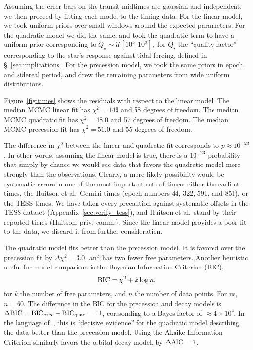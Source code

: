 \documentclass[12pt,twocolumn,tighten]{aastex62}
\begin{document}
Assuming the error bars on the transit midtimes are gaussian and
independent, we then proceed by fitting each model to the timing
data.
For the linear model, we took uniform priors over small windows around
the expected parameters.
For the quadratic model we did the same, and took the quadratic term
to have a uniform prior corresponding to
$
  Q_\star \sim \mathcal{U}[10^3, 10^9],
$
for $Q_\star$ the ``quality factor'' corresponding to the star's
response against tidal forcing, defined in
\S~\ref{sec:implications}.
For the precession model, we took the same priors in epoch and
sidereal period, and drew the remaining parameters from wide
uniform distributions.

Figure~\ref{fig:times} shows the residuals with respect to the linear
model.
The median MCMC linear fit has $\chi^2 = 149$ and 58 degrees of freedom.
The median MCMC quadratic fit has $\chi^2 = 48.0$ and 57 degrees of freedom.
The median MCMC precession fit has $\chi^2 = 51.0$ and 55 degrees of freedom.


The difference in $\chi^2$ between the linear and quadratic fit
corresponds to $p \approx 10^{-23}$. In other words, assuming the
linear model is true, there is a $10^{-23}$ probability that simply by
chance we would see data that favors the quadratic model more strongly
than the observations.  Clearly, a more likely possibility would be
systematic errors in one of the most important sets of times: either
the earliest times, the Huitson et al.\ Gemini times (epoch numbers
44, 322, 591, and 851), or the TESS times. 
We have taken every precaution against systematic offsets in the
TESS dataset (Appendix~\ref{sec:verify_tess}), and Huitson et al.\ 
stand by their reported times (Huitson, priv. comm.).
Since the linear model provides a poor fit to the data, we discard it
from further consideration.

The quadratic model fits better than the precession model.
It is favored over the precession fit by $\Delta \chi^2 = 3.0$,
and has two fewer free parameters.
Another heuristic useful for model comparison is the Bayesian
Information Criterion (BIC),
\begin{equation}
  {\rm BIC} = \chi^2 + k\log n,
\end{equation}
for $k$ the number of free parameters, and $n$ the number of data
points. For us, $n=60$.
The difference in the BIC for the precession and decay models is
$\Delta {\rm BIC} = {\rm BIC}_{\rm prec} - {\rm BIC}_{\rm quad} = 11$,
corrsonding to a Bayes factor of $\approx 4\times10^{4}$.
In the language of~\citet{kass_bayes_1995}, this is ``decisive
evidence'' for the quadratic model describing the data better than the
precession model.
Using the Akaike Information Criterion similarly favors the orbital
decay model, by $\Delta {\rm AIC} = 7$.
\end{document}
